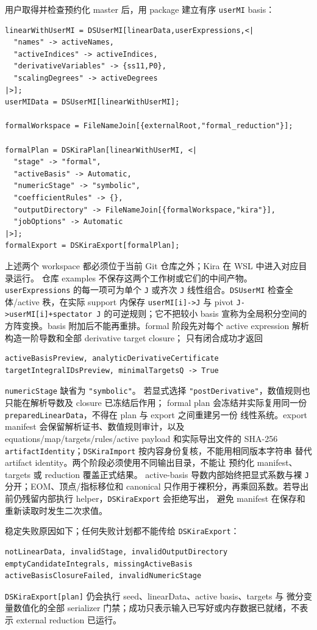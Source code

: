 ﻿\documentclass[a4paper,11pt]{article}
\begin{document}
用户取得并检查预约化 master 后，用 package 建立有序 \texttt{userMI} basis：
\begin{verbatim}
linearWithUserMI = DSUserMI[linearData,userExpressions,<|
  "names" -> activeNames,
  "activeIndices" -> activeIndices,
  "derivativeVariables" -> {ss11,P0},
  "scalingDegrees" -> activeDegrees
|>];
userMIData = DSUserMI[linearWithUserMI];

formalWorkspace = FileNameJoin[{externalRoot,"formal_reduction"}];

formalPlan = DSKiraPlan[linearWithUserMI, <|
  "stage" -> "formal",
  "activeBasis" -> Automatic,
  "numericStage" -> "symbolic",
  "coefficientRules" -> {},
  "outputDirectory" -> FileNameJoin[{formalWorkspace,"kira"}],
  "jobOptions" -> Automatic
|>];
formalExport = DSKiraExport[formalPlan];
\end{verbatim}
上述两个 workspace 都必须位于当前 Git 仓库之外；Kira 在 WSL 中进入对应目录运行。
仓库 examples 不保存这两个工作树或它们的中间产物。
\texttt{userExpressions} 的每一项可为单个 \texttt{J} 或齐次 \texttt{J} 线性组合。\texttt{DSUserMI} 检查全体/active 秩，在实际 support 内保存 \texttt{userMI[i]->J} 与 pivot \texttt{J->userMI[i]+spectator J} 的可逆规则；它不把较小 basis 宣称为全局积分空间的方阵变换。basis 附加后不能再重排。formal 阶段先对每个 active expression 解析构造一阶导数和全部 derivative target closure；
只有闭合成功才返回
\begin{verbatim}
activeBasisPreview, analyticDerivativeCertificate
targetIntegralIDsPreview, minimalTargetsQ -> True
\end{verbatim}
\texttt{numericStage} 缺省为 \texttt{"symbolic"}。
若显式选择 \texttt{"postDerivative"}，数值规则也只能在解析导数及 closure 已冻结后作用；
formal plan 会冻结并实际复用同一份 \texttt{preparedLinearData}，不得在 plan 与 export 之间重建另一份
线性系统。export manifest 会保留解析证书、数值规则审计，以及 equations/map/targets/rules/active
payload 和实际导出文件的 SHA-256 \texttt{artifactIdentity}；\texttt{DSKiraImport} 按内容身份复核，不能用相同版本字符串
替代 artifact identity。两个阶段必须使用不同输出目录，不能让
预约化 manifest、targets 或 reduction 覆盖正式结果。
active-basis 导数内部始终把显式系数与裸 \texttt{J} 分开；EOM、顶点/指标移位和 canonical
只作用于裸积分，再乘回系数。若导出前仍残留内部执行 helper，\texttt{DSKiraExport} 会拒绝写出，
避免 manifest 在保存和重新读取时发生二次求值。

稳定失败原因如下；任何失败计划都不能传给 \texttt{DSKiraExport}：
\begin{verbatim}
notLinearData, invalidStage, invalidOutputDirectory
emptyCandidateIntegrals, missingActiveBasis
activeBasisClosureFailed, invalidNumericStage
\end{verbatim}
\texttt{DSKiraExport[plan]} 仍会执行 seed、linearData、active basis、targets 与
微分变量数值化的全部 serializer 门禁；成功只表示输入已写好或内存数据已就绪，不表示
external reduction 已运行。
\end{document}
